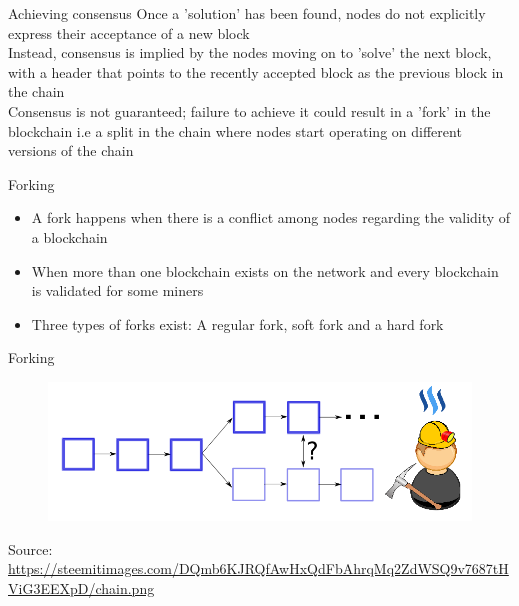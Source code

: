 \documentclass[9pt]{beamer}
\begin{document}

\begin{frame}{Achieving consensus}
	Once a 'solution' has been found, nodes do not explicitly express their acceptance of a new block\\ \vspace{3mm}
	Instead, consensus is implied by the nodes moving on to 'solve' the next block, with a header that points to the recently accepted block as the previous block in the chain\\ \vspace{3mm}
	Consensus is not guaranteed; failure to achieve it could result in a 'fork' in the blockchain i.e a split in the chain where nodes start operating on different versions of the chain
\end{frame}


\begin{frame}{Forking}
	\begin{itemize}
		\item A fork happens when there is a conflict among nodes regarding the validity of a blockchain
		\item When more than one blockchain exists on the network and every blockchain is validated for some miners
		\item Three types of forks exist: A regular fork, soft fork and a hard fork
	\end{itemize}
\end{frame}


\begin{frame}{Forking}
	\begin{figure}[]
		\centering
		\includegraphics  [scale=0.1]{Images/fork6}
	\end{figure}
	\begin{tiny}
		Source: \href{https://steemkr.com/blockchain/@rtrader/blockchain-split-soft-vs-hard-fork}{https://steemitimages.com/DQmb6KJRQfAwHxQdFbAhrqMq2ZdWSQ9v7687tHViG3EEXpD/chain.png}
	\end{tiny}
\end{frame}
\end{document}
